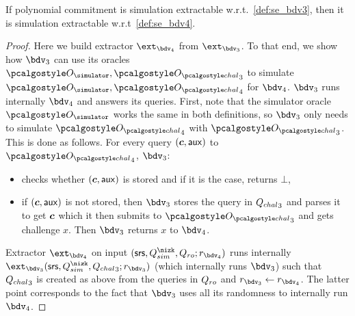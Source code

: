 \documentclass[runningheads,11pt]{llncs}
\let\spvec\vec
\let\vec\accentvec
\let\spvec\vec
\let\vec\spvec
\def\vec#1{\mathchoice{\mbox{\boldmath$\displaystyle#1$}}
  {\mbox{\boldmath$\textstyle#1$}} {\mbox{\boldmath$\scriptstyle#1$}}
  {\mbox{\boldmath$\scriptscriptstyle#1$}}}
\begin{document}
\begin{lemma}[]
  If polynomial commitment is simulation extractable w.r.t.~\cref{def:se_bdv3}, then
  it is simulation extractable w.r.t~\cref{def:se_bdv4}.
\end{lemma}
\begin{proof}
  Here we build extractor $\ext_{\bdv_4}$ from $\ext_{\bdv_3}$. To that end, we show
  how $\bdv_3$ can use its oracles $\oracles, \oraclec_3$ to simulate
  $\oracles, \oraclec_4$ for $\bdv_4$. $\bdv_3$ runs internally $\bdv_4$ and answers
  its queries. First, note that the simulator oracle $\oracles$ works the same in
  both definitions, so $\bdv_3$ only needs to simulate $\oraclec_4$ with
  $\oraclec_3$. This is done as follows. For every query $(\vec{c}, \aux)$ to
  $\oraclec_4$, $\bdv_3$:
  \begin{itemize}
  \item checks whether $(\vec{c}, \aux)$ is stored and if it is the case, returns
    $\bot$,
  \item if $(\vec{c}, \aux)$ is not stored, then $\bdv_3$ stores the query in
    ${Q_{chal}}_3$ and parses it to get $\vec{c}$ which it then submits to $\oraclec_3$
    and gets challenge $x$. Then $\bdv_3$ returns $x$ to $\bdv_4$.
  \end{itemize}

  Extractor $\ext_{\bdv_4}$ on input $(\srs, \Qsim, \Qh; r_{\bdv_4})$ runs internally
  $\ext_{\bdv_3} (\srs, \Qsim, \Qchal_3; r_{\bdv_3})$ (which internally runs
  $\bdv_3$) such that ${Q_{chal}}_3$ is created as above from the queries in $Q_{ro}$ and
  $r_{\bdv_3} \gets r_{\bdv_4}$. The latter point corresponds to the fact that
  $\bdv_3$ uses all its randomness to internally run $\bdv_4$.
\end{proof}
\fi
\end{document}
